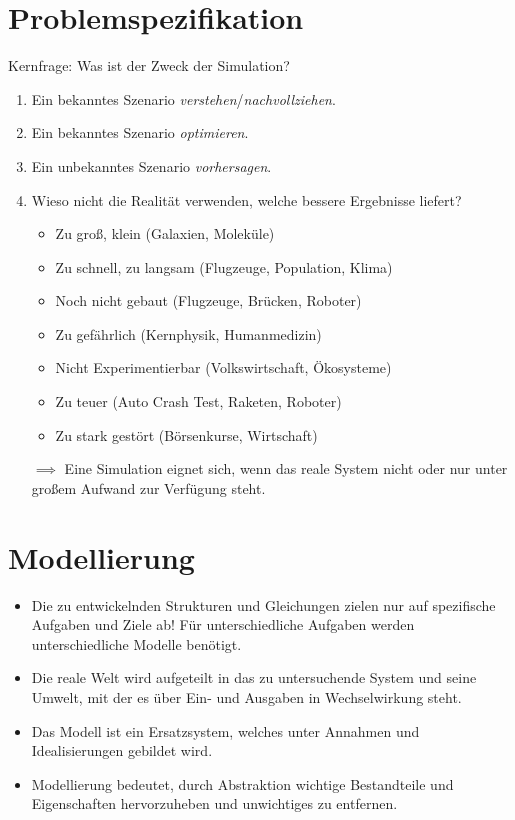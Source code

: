 	\section{Problemspezifikation} %
		\label{sec:simproblemspez}

		Kernfrage: Was ist der Zweck der Simulation?

		\begin{enumerate}
			\item Ein bekanntes Szenario \textit{verstehen}/\textit{nachvollziehen}.
			\item Ein bekanntes Szenario \textit{optimieren}.
			\item Ein unbekanntes Szenario \textit{vorhersagen}.
			\item Wieso nicht die Realität verwenden, welche bessere Ergebnisse liefert?
				\begin{itemize}
					\item Zu groß, klein (Galaxien, Moleküle)
					\item Zu schnell, zu langsam (Flugzeuge, Population, Klima)
					\item Noch nicht gebaut (Flugzeuge, Brücken, Roboter)
					\item Zu gefährlich (Kernphysik, Humanmedizin)
					\item Nicht Experimentierbar (Volkswirtschaft, Ökosysteme)
					\item Zu teuer (Auto Crash Test, Raketen, Roboter)
					\item Zu stark gestört (Börsenkurse, Wirtschaft)
				\end{itemize}
			\item[\( \implies \)] Eine Simulation eignet sich, wenn das reale System nicht oder nur unter großem Aufwand zur Verfügung steht.
		\end{enumerate}

	\section{Modellierung} %
		\label{sec:simmodelling}

		\begin{itemize}
			\item Die zu entwickelnden Strukturen und Gleichungen zielen nur auf spezifische Aufgaben und Ziele ab! Für unterschiedliche Aufgaben werden unterschiedliche Modelle benötigt.
			\item Die reale Welt wird aufgeteilt in das zu untersuchende System und seine Umwelt, mit der es über Ein- und Ausgaben in Wechselwirkung steht.
			\item Das Modell ist ein Ersatzsystem, welches unter Annahmen und Idealisierungen gebildet wird.
			\item Modellierung bedeutet, durch Abstraktion wichtige Bestandteile und Eigenschaften hervorzuheben und unwichtiges zu entfernen.
		\end{itemize}

